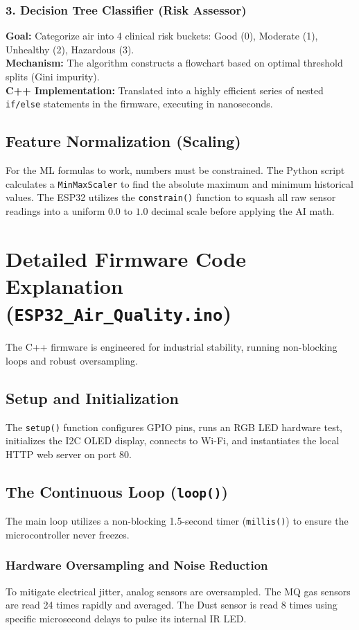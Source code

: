 \documentclass[12pt,a4paper]{article}
\begin{document}
\subsubsection{3. Decision Tree Classifier (Risk Assessor)}
\textbf{Goal:} Categorize air into 4 clinical risk buckets: Good (0), Moderate (1), Unhealthy (2), Hazardous (3).\\
\textbf{Mechanism:} The algorithm constructs a flowchart based on optimal threshold splits (Gini impurity).\\
\textbf{C++ Implementation:} Translated into a highly efficient series of nested \texttt{if/else} statements in the firmware, executing in nanoseconds.

\subsection{Feature Normalization (Scaling)}
For the ML formulas to work, numbers must be constrained. The Python script calculates a \texttt{MinMaxScaler} to find the absolute maximum and minimum historical values. The ESP32 utilizes the \texttt{constrain()} function to squash all raw sensor readings into a uniform $0.0$ to $1.0$ decimal scale before applying the AI math.

\section{Detailed Firmware Code Explanation (\texttt{ESP32\_Air\_Quality.ino})}
The C++ firmware is engineered for industrial stability, running non-blocking loops and robust oversampling.

\subsection{Setup and Initialization}
The \texttt{setup()} function configures GPIO pins, runs an RGB LED hardware test, initializes the I2C OLED display, connects to Wi-Fi, and instantiates the local HTTP web server on port 80.

\subsection{The Continuous Loop (\texttt{loop()})}
The main loop utilizes a non-blocking 1.5-second timer (\texttt{millis()}) to ensure the microcontroller never freezes.

\subsubsection{Hardware Oversampling and Noise Reduction}
To mitigate electrical jitter, analog sensors are oversampled. The MQ gas sensors are read 24 times rapidly and averaged. The Dust sensor is read 8 times using specific microsecond delays to pulse its internal IR LED.
\end{document}
